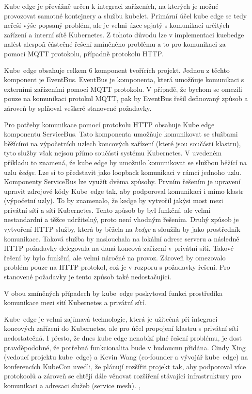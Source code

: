 Kube edge je převážně určen k integraci zařízeních, na kterých je možné provozovat samotné kontejnery a službu kubelet. Primární účel kube edge se tedy neřeší výše popsaný problém, ale je velmi úzce spjatý s komunikací určitých zařízení a interní sítě Kubernetes. Z tohoto důvodu lze v implementaci kuebedge nalést alespoň částečné řešení zmíněného problému a to pro komunikaci za pomocí MQTT protokolu, případně protokolu HTTP.

Kube~edge obsahuje celkem 6 komponent tvořících projekt. Jednou z těchto komponent je EventBus. EventBus je komponenta, která umožňuje komunikaci s externími zařízeními pomocí MQTT protokolu. V případě, že bychom se omezili pouze na komunikaci protokol MQTT, pak by EventBus řešil definovaný způsob a zároveň by splňoval veškeré stanovené požadavky.

Pro potřeby komunikace pomocí protokolu HTTP obsahuje Kube edge komponentu ServiceBus. Tato komponenta umožňuje komunikovat se službami běžícími na výpočetních uzlech koncových zařízení (které jsou součástí klastru), tyto služby však nejsou přímo součástí systému Kubernetes. V uvedeném příkladu to znamená, že kube edge by umožnilo komunikovat se službou běžící na uzlu \textit{kedge}. Lze si to představit jako loopback komunikaci v rámci jednoho uzlu. Komponenty ServiceBus lze využít dvěma způsoby. Prvním řešením je upravení upravit zdrojové kódy Kube~edge tak, aby podporoval komunikaci i mimo klastr (výpočetní uzly). To by znamenalo, že kedge by vytvořil jakýsi most mezi privátní sítí a sítí Kubernetes. Tento způsob by byl funkční, ale velmi nestandardní a těžce udržitelný, proto není vhodným řešením. Druhý způsob je vytvoření HTTP služby, která by běžela na \textit{kedge} a sloužila by jako prostředník komunikace. Taková služba by naslouchala na lokální adrese serveru a následně HTTP požadavky delegovala na daná koncová zařízení v privátní síti. Takové řešení by bylo funkční, ale velmi náročné na provoz. Zároveň by omezovalo problém pouze na HTTP protokol, což je v rozporu s požadavky řešení. Pro stanovené požadavky je tento způsob také nedostačující. \cite{ttlv_2021_servicebusgo}

V obou zmíněných případech by kube~edge poskytoval funkci prostředíka komunikace mezi sítí Kubernetes a privátní sítí.

Kube~edge je velmi zajímavá technologie, která je užitečná při integraci koncových zařízení do Kubernetes, ale pro účel propojení klastru s privátní sítí nedostatečná. I přesto, že dnes kube edge nenabízí plné řešení problému, je dost pravděpodobné, že potřebná funkcionalita bude v budoucnu přidána. Cindy Xing (vedoucí projektu kube~edge) a Kevin Wang (co-founder a vývojář kube~edge) na konferencích KubeCon uvedli, že plánují rozšířit projekt tak, aby podporoval více protokoolů a zároveň se chtějí dále věnovat rozšíření stávající infrastruktury pro komunikaci a adresaci služeb (service mesh). \cite{cncfcloudnativecomputingfoundation_2019_intro}, \cite{cncfcloudnativecomputingfoundation_2022_intro}

